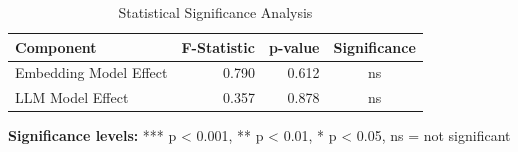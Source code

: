 \begin{table}[H]
\caption{Statistical Significance Analysis}
\label{tab:statistical_significance}
\begin{tabular}{lrrc}
\toprule
Component & F-Statistic & p-value & Significance \\
\midrule
Embedding Model Effect & 0.790 & 0.612 & ns \\
LLM Model Effect & 0.357 & 0.878 & ns \\
\bottomrule
\end{tabular}
\end{table}

\textbf{Significance levels:} *** p < 0.001, ** p < 0.01, * p < 0.05, ns = not significant